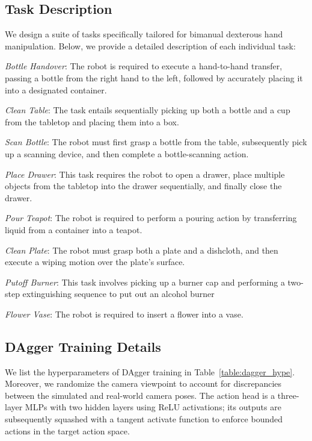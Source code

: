 \subsection{Task Description}
We design a suite of tasks specifically tailored for bimanual dexterous hand manipulation. Below, we provide a detailed description of each individual task:

\textit{Bottle Handover}: The robot is required to execute a hand-to-hand transfer, passing a bottle from the right hand to the left, followed by accurately placing it into a designated container.

\textit{Clean Table}: The task entails sequentially picking up both a bottle and a cup from the tabletop and placing them into a box.  

\textit{Scan Bottle}: The robot must first grasp a bottle from the table, subsequently pick up a scanning device, and then complete a bottle-scanning action. 

\textit{Place Drawer}: This task requires the robot to open a drawer, place multiple objects from the tabletop into the drawer sequentially, and finally close the drawer. 

\textit{Pour Teapot}: The robot is required to perform a pouring action by transferring liquid from a container into a teapot. 

\textit{Clean Plate}: The robot must grasp both a plate and a dishcloth, and then execute a wiping motion over the plate’s surface. 

\textit{Putoff Burner}: This task involves picking up a burner cap and performing a two-step extinguishing sequence to put out an alcohol burner

\textit{Flower Vase}: The robot is required to insert a flower into a vase. 




\subsection{DAgger Training Details}
\label{sec:dagger}
We list the hyperparameters of DAgger training in Table~\ref{table:dagger_hype}. Moreover, we randomize the camera viewpoint to account for discrepancies between the simulated and real-world camera poses. The action head is a three-layer MLPs with two hidden layers using ReLU activations; its outputs are subsequently squashed with a tangent activate function to enforce bounded actions in the target action space. 


